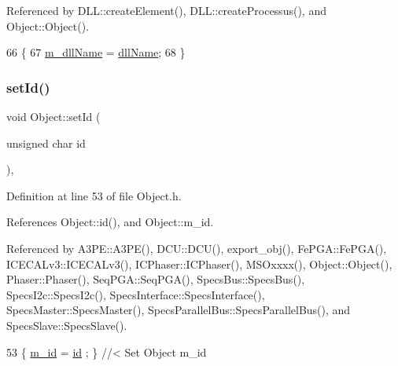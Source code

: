 Referenced by D\+L\+L\+::create\+Element(), D\+L\+L\+::create\+Processus(), and Object\+::\+Object().


\begin{DoxyCode}
66                                       \{
67     \hyperlink{classObject_a01afbeacebb8db6831559972ec362eb3}{m\_dllName} = \hyperlink{classObject_a2e3947f2870094c332d7454117f3ec63}{dllName};
68   \}
\end{DoxyCode}
\mbox{\label{classObject_a398fe08cba594a0ce6891d59fe4f159f}} 
\subsubsection{\texorpdfstring{set\+Id()}{setId()}}
{\footnotesize\ttfamily void Object\+::set\+Id (\begin{DoxyParamCaption}\item[{unsigned char}]{id }\end{DoxyParamCaption})\hspace{0.3cm}{\ttfamily [inline]}, {\ttfamily [inherited]}}



Definition at line 53 of file Object.\+h.



References Object\+::id(), and Object\+::m\+\_\+id.



Referenced by A3\+P\+E\+::\+A3\+P\+E(), D\+C\+U\+::\+D\+C\+U(), export\+\_\+obj(), Fe\+P\+G\+A\+::\+Fe\+P\+G\+A(), I\+C\+E\+C\+A\+Lv3\+::\+I\+C\+E\+C\+A\+Lv3(), I\+C\+Phaser\+::\+I\+C\+Phaser(), M\+S\+Oxxxx(), Object\+::\+Object(), Phaser\+::\+Phaser(), Seq\+P\+G\+A\+::\+Seq\+P\+G\+A(), Specs\+Bus\+::\+Specs\+Bus(), Specs\+I2c\+::\+Specs\+I2c(), Specs\+Interface\+::\+Specs\+Interface(), Specs\+Master\+::\+Specs\+Master(), Specs\+Parallel\+Bus\+::\+Specs\+Parallel\+Bus(), and Specs\+Slave\+::\+Specs\+Slave().


\begin{DoxyCode}
53 \{ \hyperlink{classObject_aca74b9dbfed7b5556ea2d56c65b6b6b0}{m\_id}    = \hyperlink{classObject_af99145335cc61ff6e2798ea17db009d2}{id}    ; \} \textcolor{comment}{//< Set Object m\_id}
\end{DoxyCode}
\mbox{\label{classObject_ae30fea75683c2d149b6b6d17c09ecd0c}} 
